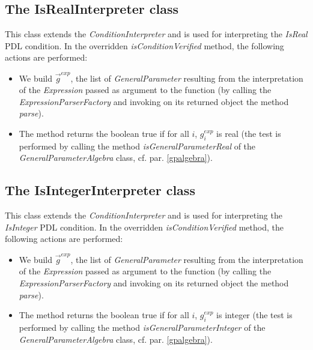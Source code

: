 \documentclass[a4paper,11pt] {ivoa}
\begin{document}
\subsection{The IsRealInterpreter class}
This class  extends the  {\it ConditionInterpreter} and is used for interpreting the {\it IsReal} PDL condition. In the overridden {\it isConditionVerified} method, the following actions are performed:
\begin{itemize}
\item We build $\vec g^{exp}$, the list of {\it GeneralParameter} resulting from the interpretation of the {\it Expression} passed as argument to the function (by calling the {\it ExpressionParserFactory} and invoking on its returned object the method {\it parse}). 
\item The method returns the boolean true if for all $i$, $g_i^{exp}$ is real (the test is performed by calling the method {\it isGeneralParameterReal} of the {\it GeneralParameterAlgebra} class, cf. par. \ref{gpalgebra}).
\end{itemize}

\subsection{The IsIntegerInterpreter class}
This class  extends the  {\it ConditionInterpreter} and is used for interpreting the {\it IsInteger} PDL condition. In the overridden {\it isConditionVerified} method, the following actions are performed:
\begin{itemize}
\item We build $\vec g^{exp}$, the list of {\it GeneralParameter} resulting from the interpretation of the {\it Expression} passed as argument to the function (by calling the {\it ExpressionParserFactory} and invoking on its returned object the method {\it parse}). 
\item The method returns the boolean true if for all $i$, $g_i^{exp}$ is integer (the test is performed by calling the method {\it isGeneralParameterInteger} of the {\it GeneralParameterAlgebra} class, cf. par. \ref{gpalgebra}).
\end{itemize}
\end{document}

